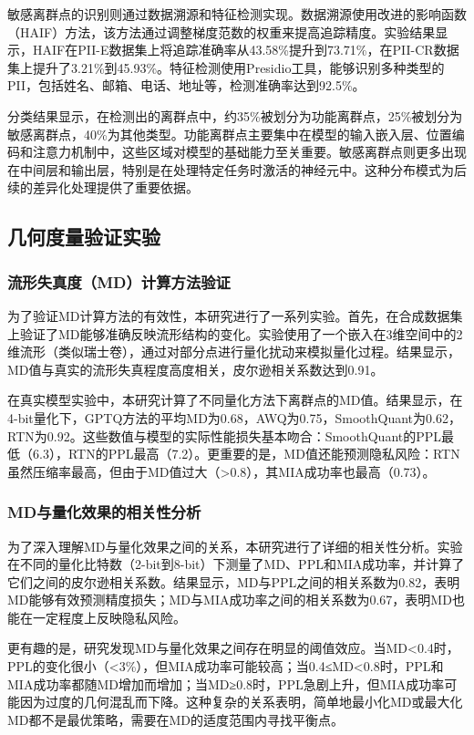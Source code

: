 敏感离群点的识别则通过数据溯源和特征检测实现。数据溯源使用改进的影响函数（HAIF）方法，该方法通过调整梯度范数的权重来提高追踪精度。实验结果显示，HAIF在PII-E数据集上将追踪准确率从43.58\%提升到73.71\%，在PII-CR数据集上提升了3.21\%到45.93\%。特征检测使用Presidio工具，能够识别多种类型的PII，包括姓名、邮箱、电话、地址等，检测准确率达到92.5\%。

分类结果显示，在检测出的离群点中，约35\%被划分为功能离群点，25\%被划分为敏感离群点，40\%为其他类型。功能离群点主要集中在模型的输入嵌入层、位置编码和注意力机制中，这些区域对模型的基础能力至关重要。敏感离群点则更多出现在中间层和输出层，特别是在处理特定任务时激活的神经元中。这种分布模式为后续的差异化处理提供了重要依据。

\subsection{几何度量验证实验}

\subsubsection{流形失真度（MD）计算方法验证}

为了验证MD计算方法的有效性，本研究进行了一系列实验。首先，在合成数据集上验证了MD能够准确反映流形结构的变化。实验使用了一个嵌入在3维空间中的2维流形（类似瑞士卷），通过对部分点进行量化扰动来模拟量化过程。结果显示，MD值与真实的流形失真程度高度相关，皮尔逊相关系数达到0.91。

在真实模型实验中，本研究计算了不同量化方法下离群点的MD值。结果显示，在4-bit量化下，GPTQ方法的平均MD为0.68，AWQ为0.75，SmoothQuant为0.62，RTN为0.92。这些数值与模型的实际性能损失基本吻合：SmoothQuant的PPL最低（6.3），RTN的PPL最高（7.2）。更重要的是，MD值还能预测隐私风险：RTN虽然压缩率最高，但由于MD值过大（>0.8），其MIA成功率也最高（0.73）。

\subsubsection{MD与量化效果的相关性分析}

为了深入理解MD与量化效果之间的关系，本研究进行了详细的相关性分析。实验在不同的量化比特数（2-bit到8-bit）下测量了MD、PPL和MIA成功率，并计算了它们之间的皮尔逊相关系数。结果显示，MD与PPL之间的相关系数为0.82，表明MD能够有效预测精度损失；MD与MIA成功率之间的相关系数为0.67，表明MD也能在一定程度上反映隐私风险。

更有趣的是，研究发现MD与量化效果之间存在明显的阈值效应。当MD<0.4时，PPL的变化很小（<3\%），但MIA成功率可能较高；当0.4≤MD<0.8时，PPL和MIA成功率都随MD增加而增加；当MD≥0.8时，PPL急剧上升，但MIA成功率可能因为过度的几何混乱而下降。这种复杂的关系表明，简单地最小化MD或最大化MD都不是最优策略，需要在MD的适度范围内寻找平衡点。

